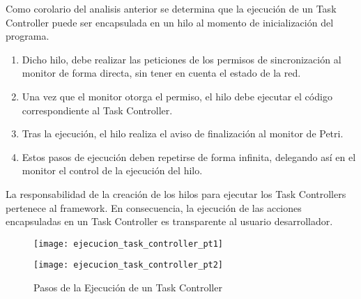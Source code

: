 Como corolario del analisis anterior se determina que la ejecución de un Task
Controller puede ser encapsulada en un hilo al momento de inicialización del programa.
\begin{enumerate}
  \item Dicho hilo, debe realizar las peticiones de los permisos de sincronización al
  monitor de forma directa, sin tener en cuenta el estado de la red.
  \item  Una vez que el monitor otorga el permiso, el hilo debe ejecutar el
  código correspondiente al Task Controller.
  \item  Tras la ejecución, el hilo realiza el aviso de finalización al
  monitor de Petri.
  \item Estos pasos de ejecución deben repetirse de forma infinita, delegando así en el
  monitor el control de la ejecución del hilo.
\end{enumerate}

La responsabilidad de la creación de los hilos para ejecutar los Task
Controllers pertenece al framework. En consecuencia, la ejecución de las
acciones encapsuladas en un Task Controller es transparente al usuario
desarrollador.

\begin{figure}[H]
	\centering
	\texttt{[image: ejecucion\_task\_controller\_pt1]}
\end{figure}
\begin{figure}[H]
	\centering
	\texttt{[image: ejecucion\_task\_controller\_pt2]}
	\caption{Pasos de la Ejecución de un Task Controller}
	\label{fig:ejecucion_task_controller}
\end{figure}

\newpage

